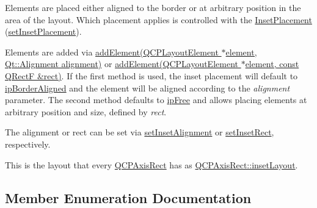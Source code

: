 Elements are placed either aligned to the border or at arbitrary position in the area of the layout. Which placement applies is controlled with the \hyperlink{classQCPLayoutInset_a8b9e17d9a2768293d2a7d72f5e298192}{Inset\+Placement} (\hyperlink{classQCPLayoutInset_a63298830744d5d8c5345511c00fd2144}{set\+Inset\+Placement}).

Elements are added via \hyperlink{classQCPLayoutInset_ad61529eb576af7f04dff94abb10c745a}{add\+Element(\+Q\+C\+P\+Layout\+Element $\ast$element, Qt\+::\+Alignment alignment)} or \hyperlink{classQCPLayoutInset_a8ff61fbee4a1f0ff45c398009d9f1e56}{add\+Element(\+Q\+C\+P\+Layout\+Element $\ast$element, const Q\+Rect\+F \&rect)}. If the first method is used, the inset placement will default to \hyperlink{classQCPLayoutInset_a8b9e17d9a2768293d2a7d72f5e298192aa81e7df4a785ddee2229a8f47c46e817}{ip\+Border\+Aligned} and the element will be aligned according to the {\itshape alignment} parameter. The second method defaults to \hyperlink{classQCPLayoutInset_a8b9e17d9a2768293d2a7d72f5e298192aa4802986ea2cea457f932b115acba59e}{ip\+Free} and allows placing elements at arbitrary position and size, defined by {\itshape rect}.

The alignment or rect can be set via \hyperlink{classQCPLayoutInset_a62882a4f9ad58bb0f53da12fde022abe}{set\+Inset\+Alignment} or \hyperlink{classQCPLayoutInset_aa487c8378a6f9533567a2e6430099dc3}{set\+Inset\+Rect}, respectively.

This is the layout that every \hyperlink{classQCPAxisRect}{Q\+C\+P\+Axis\+Rect} has as \hyperlink{classQCPAxisRect_a4114887c7141b59650b7488f930993e5}{Q\+C\+P\+Axis\+Rect\+::inset\+Layout}. 

\subsection{Member Enumeration Documentation}

